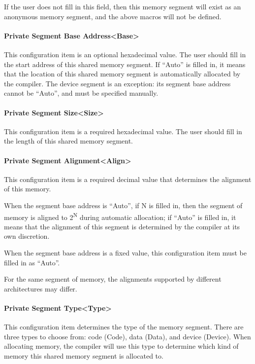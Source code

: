If the user does not fill in this field, then this memory segment will exist as an anonymous memory segment, and the above macros will not be defined.

\paragraph{Private Segment Base Address<Base>{}}\label{par:5-3-14-14-2}

This configuration item is an optional hexadecimal value. The user should fill in the start address of this shared memory segment. If ``Auto'' is filled in, it means that the location of this shared memory segment is automatically allocated by the compiler. The device segment is an exception: its segment base address cannot be ``Auto'', and must be specified manually.

\paragraph{Private Segment Size<Size>{}}\label{par:5-3-14-14-3}

This configuration item is a required hexadecimal value. The user should fill in the length of this shared memory segment.

\paragraph{Private Segment Alignment<Align>{}}\label{par:5-3-14-14-4}

This configuration item is a required decimal value that determines the alignment of this memory.

When the segment base address is ``Auto'', if N is filled in, then the segment of memory is aligned to 2\textsuperscript{N} during automatic allocation; if ``Auto'' is filled in, it means that the alignment of this segment is determined by the compiler at its own discretion.

When the segment base address is a fixed value, this configuration item must be filled in as ``Auto''.

For the same segment of memory, the alignments supported by different architectures may differ.

\paragraph{Private Segment Type<Type>{}}\label{par:5-3-14-14-5}

This configuration item determines the type of the memory segment. There are three types to choose from: code (Code), data (Data), and device (Device). When allocating memory, the compiler will use this type to determine which kind of memory this shared memory segment is allocated to.

